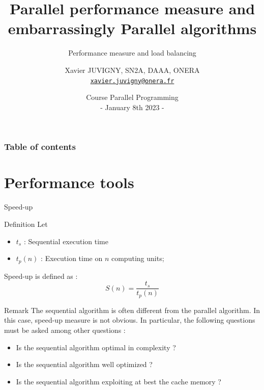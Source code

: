 \documentclass[compress,10pt,aspectratio=169]{beamer}
\title[Parallel programming\hspace{2em}]{Parallel performance measure and embarrassingly Parallel algorithms}
\subtitle{Performance measure and load balancing}
\author[X. JUVIGNY]{Xavier JUVIGNY, SN2A, DAAA, ONERA\\ \href{mailto:xavier.juvigny@onera.fr}{\texttt{xavier.juvigny@onera.fr}} }
\date[01/08/2023]{Course Parallel Programming\\- January 8th 2023 -}
\institute{\inst{1}ONERA,\inst{2}DAAA}
\begin{document}
\MakeTitlePage

\begin{frame}
\frametitle{Table of contents}
\begin{multicols}{2}
\tableofcontents[hideallsubsections]
\end{multicols}
\end{frame}

\section{Performance tools}

\begin{frame}{Speed-up}
    \scriptsize
    \begin{block}{Definition}
        Let
        \begin{itemize}
        \item $t_{s}$ : Sequential execution time
        \item $t_{p}(n)$ : Execution time on $n$ computing units;
        \end{itemize}

        Speed-up is defined as :        
        \begin{equation}
         S(n) = \frac{t_{s}}{t_{p}(n)}
        \end{equation}
    \end{block}
        
    \begin{alertblock}{Remark}
        The sequential algorithm is often different from the parallel algorithm. In this case,
        speed-up measure is not obvious. In particular, the following questions must be 
        asked among other questions :
        \begin{itemize}
            \item Is the sequential algorithm optimal in complexity ?
            \item Is the sequential algorithm well optimized ?
            \item Is the sequential algorithm exploiting at best the cache memory ?
        \end{itemize} 
    \end{alertblock}
        
\end{frame}
\end{document}
